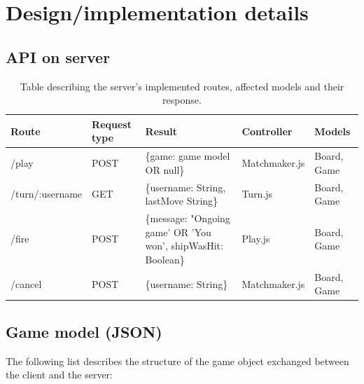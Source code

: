 \section{Design/implementation details}

\subsection{API on server}

\begin{table}[h]
\begin{tabular}{|p{3.1cm}|p{1.7cm}|p{5cm}|p{3cm}|p{2.5cm}|}
\hline
\textbf{Route}  & \textbf{Request type} & \textbf{Result}                                                & \textbf{Controller} & \textbf{Models} \\ \hline
/play           & POST                  & \{game: game model OR null\}                                  & Matchmaker.js       & Board, Game     \\ \hline
/turn/:username & GET                   & \{username: String, lastMove String\}                                           & Turn.js             & Board, Game     \\ \hline
/fire           & POST                  & \{message: "Ongoing game' OR 'You won',  shipWasHit: Boolean\} & Play.js             & Board, Game     \\ \hline
/cancel         & POST                  & \{username: String\}                                           & Matchmaker.js       & Board, Game     \\ \hline
\end{tabular}
\label{tab:server-routes}
\caption{Table describing the server's implemented routes, affected models and their response.}
\end{table}


\subsection{Game model (JSON)}
The following list describes the structure of the game object exchanged between the client and the server: 

